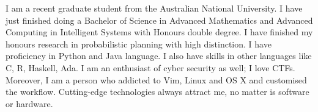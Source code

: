

\begin{cvparagraph}

I am a recent graduate student from the Australian National University. I have just finished doing a Bachelor of Science in Advanced Mathematics and Advanced Computing in Intelligent Systems with Honours double degree. I have finished my honours research in probabilistic planning with high distinction. I have proficiency in Python and Java language. I also have skills in other languages like C, R, Haskell, Ada. I am an enthusiast of cyber security as well; I love CTFs. Moreover, I am a person who addicted to Vim, Linux and OS X and customised the workflow. Cutting-edge technologies always attract me, no matter is software or hardware.
\end{cvparagraph}
